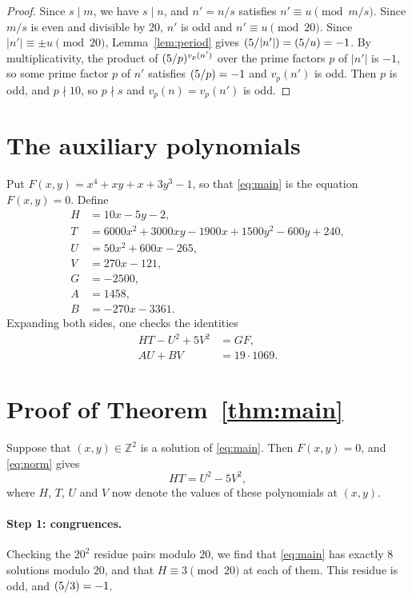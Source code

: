 \documentclass[11pt]{article}
\newcommand{\Z}{\mathbb{Z}}
\newcommand{\leg}[2]{\mathchoice{\biggl(\dfrac{#1}{#2}\biggr)}{(#1/#2)}{(#1/#2)}{(#1/#2)}}
\begin{document}
\begin{proof}
Since $s\mid m$, we have $s\mid n$, and $n'=n/s$ satisfies $n'\equiv u\pmod{m/s}$. Since $m/s$ is even and divisible by $20$, $n'$ is odd and $n'\equiv u\pmod{20}$. Since $|n'|\equiv\pm u\pmod{20}$, Lemma~\ref{lem:period} gives $\leg{5}{|n'|}=\leg{5}{u}=-1$. By multiplicativity, the product of $\leg{5}{p}^{v_p(n')}$ over the prime factors $p$ of $|n'|$ is $-1$, so some prime factor $p$ of $n'$ satisfies $\leg{5}{p}=-1$ and $v_p(n')$ is odd. Then $p$ is odd, and $p\nmid10$, so $p\nmid s$ and $v_p(n)=v_p(n')$ is odd.
\end{proof}

\section{The auxiliary polynomials}

Put $F(x,y)=x^{4}+xy+x+3y^{3}-1$, so that \eqref{eq:main} is the equation $F(x,y)=0$. Define
\begin{align*}
H&=10x-5y-2,\\
T&=6000x^{2}+3000xy-1900x+1500y^{2}-600y+240,\\
U&=50x^{2}+600x-265,\\
V&=270x-121,\\
G&=-2500,\\
A&=1458,\\
B&=-270x-3361.
\end{align*}
Expanding both sides, one checks the identities
\begin{align}
HT-U^2+5V^2&=GF,\label{eq:norm}\\
AU+BV&=19\cdot 1069.\label{eq:bezout}
\end{align}

\section{Proof of Theorem~\ref{thm:main}}

Suppose that $(x,y)\in\Z^2$ is a solution of \eqref{eq:main}. Then $F(x,y)=0$, and \eqref{eq:norm} gives
\begin{equation}\label{eq:HT}
HT=U^2-5V^2,
\end{equation}
where $H$, $T$, $U$ and $V$ now denote the values of these polynomials at $(x,y)$.

\paragraph{Step 1: congruences.} Checking the $20^2$ residue pairs modulo $20$, we find that \eqref{eq:main} has exactly 8 solutions modulo $20$, and that $H\equiv3\pmod{20}$ at each of them. This residue is odd, and $\leg{5}{3}=-1$.
\end{document}
